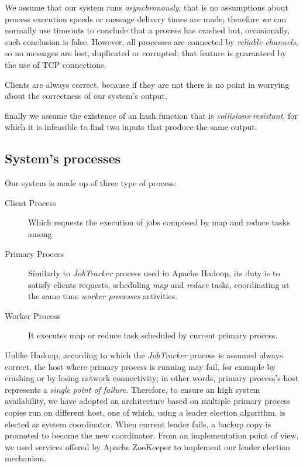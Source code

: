 \documentclass[sigchi]{acmart}
\begin{document}
We assume that our system runs \textit{asynchronously}, that is no assumptions about process execution speeds or message delivery times are made; therefore we can normally use timeouts to conclude that a process has crashed but, occasionally, such conclusion is false. However, all processes are connected by \textit{reliable channels}, so no messages are lost, duplicated or corrupted; that feature is guaranteed by the use of TCP connections. 

Clients are always correct, because if they are not there is no point in worrying about the correctness of our system's output.

finally we assume the existence of an hash function that is \textit{collisions-resistant}, for which it is infeasible to find two inputs that produce the same output.

\subsection{System's processes}

Our system is made up of three type of process:

\begin{description}
\item[Client Process] Which requests the execution of jobs composed by map and reduce tasks among

\item[Primary Process] Similarly to \textit{JobTracker} process used in Apache Hadoop, its duty is to satisfy clients requests, scheduling \textit{map} and \textit{reduce} tasks, coordinating at the same time \textit{worker processes} activities. 

\item[Worker Process] It executes map or reduce task scheduled by current primary process.
\end{description}

Unlike Hadoop, according to which the \textit{JobTracker} process is assumed always correct, the host where primary process is running may fail, for example by crashing or by losing network connectivity; in other words, primary process's host represents a \textit{single point of failure}. Therefore, to ensure an high system availability, we have adopted an architecture based on multiple primary process copies run on different host, one of which, using a leader election algorithm, is elected as system coordinator. When current leader fails, a backup copy is promoted to become the new coordinator. From an implementation point of view, we used services offered by Apache ZooKeeper to implement our leader election mechanism.
\end{document}
